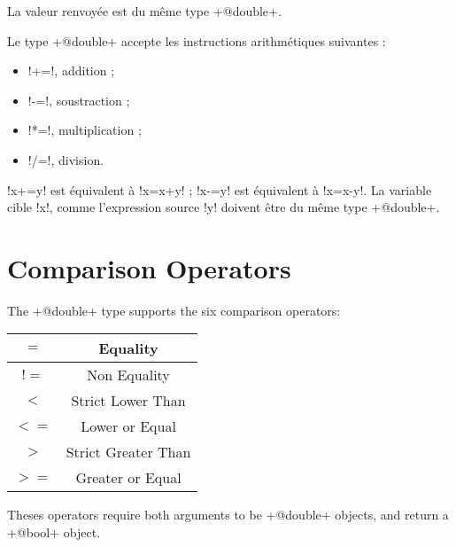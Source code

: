 La valeur renvoyée est du même type  \ggst+@double+.



Le type \ggst+@double+ accepte les instructions arithmétiques suivantes :
\begin{itemize}
  \item \ggst!+=!, addition ;
  \item \ggst!-=!, soustraction ;
  \item \ggst!*=!, multiplication ;
  \item \ggst!/=!, division.
\end{itemize}

\ggst!x+=y! est équivalent à \ggst!x=x+y! ; \ggst!x-=y! est équivalent à \ggst!x=x-y!.
La variable cible \ggst!x!, comme l'expression source \ggst!y! doivent être du même type \ggst+@double+.







\section{Comparison Operators}

The \ggst+@double+ type supports the six comparison operators:\newline

\begin{tabular}{|c|c|}
\hline
$=$ & Equality \\
\hline
$!=$ & Non Equality \\
\hline
$<$  & Strict Lower Than \\
\hline
$<=$  & Lower or Equal \\
\hline
$>$  & Strict Greater Than \\
\hline
$>=$  & Greater or Equal \\
\hline
\end{tabular}

Theses operators require both arguments to be \ggst+@double+ objects, and return a \ggst+@bool+ object.


